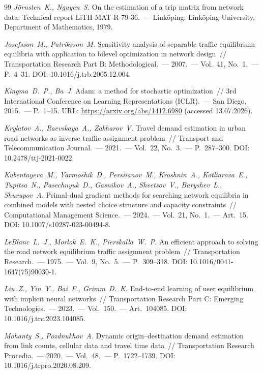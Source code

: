 \documentclass{crm-article}
\begin{document}
\begin{thebibliography}{99}
{\it J\"ornsten~K., Nguyen~S.}
On the estimation of a trip matrix from network data: Technical report
LiTH-MAT-R-79-36.~--- Link\"oping: Link\"oping University, Department of
Mathematics, 1979.

{\it Josefsson~M., Patriksson~M.}
Sensitivity analysis of separable traffic equilibrium equilibria with
application to bilevel optimization in network design~// Transportation
Research Part B: Methodological.~--- 2007.~--- Vol.~41, No.~1.~---
P.~4--31. DOI: 10.1016/j.trb.2005.12.004.

{\it Kingma~D.~P., Ba~J.}
Adam: a method for stochastic optimization~// 3rd International Conference
on Learning Representations (ICLR).~--- San Diego, 2015.~--- P.~1--15.
URL: \url{https://arxiv.org/abs/1412.6980} (accessed 13.07.2026).

{\it Krylatov~A., Raevskaya~A., Zakharov~V.}
Travel demand estimation in urban road networks as inverse traffic
assignment problem~// Transport and Telecommunication Journal.~--- 2021.~---
Vol.~22, No.~3.~--- P.~287--300. DOI: 10.2478/ttj-2021-0022.

{\it Kubentayeva~M., Yarmoshik~D., Persiianov~M., Kroshnin~A.,
Kotliarova~E., Tupitsa~N., Pasechnyuk~D., Gasnikov~A., Shvetsov~V.,
Baryshev~L., Shurupov~A.}
Primal-dual gradient methods for searching network equilibria in combined
models with nested choice structure and capacity constraints~//
Computational Management Science.~--- 2024.~--- Vol.~21, No.~1.~--- Art.~15.
DOI: 10.1007/s10287-023-00494-8.

{\it LeBlanc~L.~J., Morlok~E.~K., Pierskalla~W.~P.}
An efficient approach to solving the road network equilibrium traffic
assignment problem~// Transportation Research.~--- 1975.~--- Vol.~9,
No.~5.~--- P.~309--318. DOI: 10.1016/0041-1647(75)90030-1.

{\it Liu~Z., Yin~Y., Bai~F., Grimm~D.~K.}
End-to-end learning of user equilibrium with implicit neural networks~//
Transportation Research Part C: Emerging Technologies.~--- 2023.~---
Vol.~150.~--- Art.~104085. DOI: 10.1016/j.trc.2023.104085.

{\it Mohanty~S., Pozdnukhov~A.}
Dynamic origin--destination demand estimation from link counts, cellular
data and travel time data~// Transportation Research Procedia.~--- 2020.~---
Vol.~48.~--- P.~1722--1739. DOI: 10.1016/j.trpro.2020.08.209.


\end{thebibliography}
\end{document}
